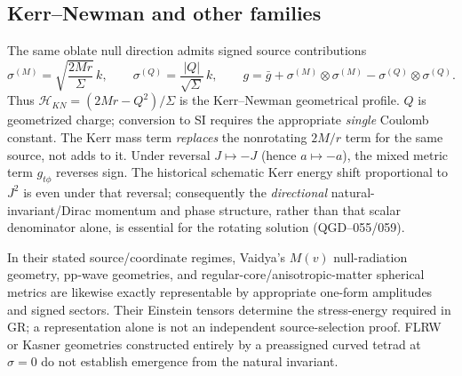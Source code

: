\documentclass[11pt,a4paper]{article}
\begin{document}
\subsection{Kerr--Newman and other families}
The same oblate null direction admits signed source contributions
\begin{equation}\label{eq:kn-sources}
 \sigma^{(M)}=\sqrt{\frac{2Mr}{\Sigma}}\,k,
 \qquad\sigma^{(Q)}=\frac{|Q|}{\sqrt\Sigma}\,k,
 \qquad g=\bar g+\sigma^{(M)}\!\otimes\sigma^{(M)}
 -\sigma^{(Q)}\!\otimes\sigma^{(Q)}.
\end{equation}
Thus $\mathcal H_{KN}=(2Mr-Q^2)/\Sigma$ is the Kerr--Newman geometrical profile. $Q$ is geometrized charge; conversion to SI requires the appropriate \emph{single} Coulomb constant. The Kerr mass term \emph{replaces} the nonrotating $2M/r$ term for the same source, not adds to it.  Under reversal $J\mapsto-J$ (hence $a\mapsto-a$), the mixed metric term $g_{t\phi}$ reverses sign.  The historical schematic Kerr energy shift proportional to $J^2$ is even under that reversal; consequently the \emph{directional} natural-invariant/Dirac momentum and phase structure, rather than that scalar denominator alone, is essential for the rotating solution (QGD--055/059).

In their stated source/coordinate regimes, Vaidya's $M(v)$ null-radiation geometry, pp-wave geometries, and regular-core/anisotropic-matter spherical metrics are likewise exactly representable by appropriate one-form amplitudes and signed sectors. Their Einstein tensors determine the stress-energy required in GR; a representation alone is not an independent source-selection proof. FLRW or Kasner geometries constructed entirely by a preassigned curved tetrad at $\sigma=0$ do not establish emergence from the natural invariant.
\end{document}
